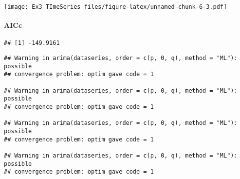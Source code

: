 \documentclass[]{article}
\newenvironment{Shaded}{\begin{snugshade}}{\end{snugshade}}
\newcommand{\KeywordTok}[1]{\textcolor[rgb]{0.13,0.29,0.53}{\textbf{#1}}}
\newcommand{\DataTypeTok}[1]{\textcolor[rgb]{0.13,0.29,0.53}{#1}}
\newcommand{\DecValTok}[1]{\textcolor[rgb]{0.00,0.00,0.81}{#1}}
\newcommand{\StringTok}[1]{\textcolor[rgb]{0.31,0.60,0.02}{#1}}
\newcommand{\CommentTok}[1]{\textcolor[rgb]{0.56,0.35,0.01}{\textit{#1}}}
\newcommand{\ControlFlowTok}[1]{\textcolor[rgb]{0.13,0.29,0.53}{\textbf{#1}}}
\newcommand{\OperatorTok}[1]{\textcolor[rgb]{0.81,0.36,0.00}{\textbf{#1}}}
\newcommand{\NormalTok}[1]{#1}
\let\oldparagraph\paragraph
\renewcommand{\paragraph}[1]{\oldparagraph{#1}\mbox{}}
\begin{document}
\texttt{[image: Ex3\_TImeSeries\_files/figure-latex/unnamed-chunk-6-3.pdf]}

\paragraph{AICc}\label{aicc}

\begin{Shaded}
\end{Shaded}

\begin{verbatim}
## [1] -149.9161
\end{verbatim}

\begin{Shaded}
\end{Shaded}

\begin{verbatim}
## Warning in arima(dataseries, order = c(p, 0, q), method = "ML"): possible
## convergence problem: optim gave code = 1

## Warning in arima(dataseries, order = c(p, 0, q), method = "ML"): possible
## convergence problem: optim gave code = 1

## Warning in arima(dataseries, order = c(p, 0, q), method = "ML"): possible
## convergence problem: optim gave code = 1

## Warning in arima(dataseries, order = c(p, 0, q), method = "ML"): possible
## convergence problem: optim gave code = 1
\end{verbatim}
\end{document}
